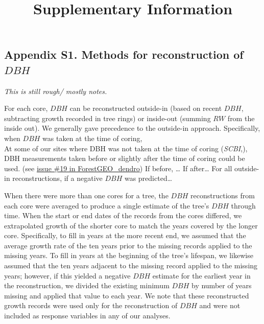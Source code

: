 \documentclass[
]{article}
\title{Supplementary Information}
\author{}
\date{\vspace{-2.5em}}
\begin{document}
\maketitle

{
\setcounter{tocdepth}{3}
\tableofcontents
}
\newpage

\hypertarget{appendix-s1.-methods-for-reconstruction-of-dbh}{%
\subsection{\texorpdfstring{Appendix S1. Methods for reconstruction of
\(DBH\)}{Appendix S1. Methods for reconstruction of DBH}}\label{appendix-s1.-methods-for-reconstruction-of-dbh}}

\emph{This is still rough/ mostly notes.}

For each core, \(DBH\) can be reconstructed outside-in (based on recent
\(DBH\), subtracting growth recorded in tree rings) or inside-out
(summing \(RW\) from the inside out). We generally gave precedence to
the outside-in approach. Specifically, when \(DBH\) was taken at the
time of coring,\\
At some of our sites where DBH was not taken at the time of coring
(\emph{SCBI},), DBH measurements taken before or slightly after the time
of coring could be used. (see
\href{https://github.com/EcoClimLab/ForestGEO_dendro/issues/19}{issue
\#19 in ForestGEO\_dendro}) If before, \ldots{} If after\ldots{} For all
outside-in reconstructions, if a negative \(DBH\) was predicted\ldots{}

When there were more than one cores for a tree, the \(DBH\)
reconstructions from each core were averaged to produce a single
estimate of the tree's \(DBH\) through time. When the start or end dates
of the records from the cores differed, we extrapolated growth of the
shorter core to match the years covered by the longer core.
Specifically, to fill in years at the more recent end, we assumed that
the average growth rate of the ten years prior to the missing records
applied to the missing years. To fill in years at the beginning of the
tree's lifespan, we likewise assumed that the ten years adjacent to the
missing record applied to the missing years; however, if this yielded a
negative \(DBH\) estimate for the earliest year in the reconstruction,
we divided the existing minimum \(DBH\) by number of years missing and
applied that value to each year. We note that these reconstructed growth
records were used only for the reconstruction of \(DBH\) and were not
included as response variables in any of our analyses.
\end{document}
